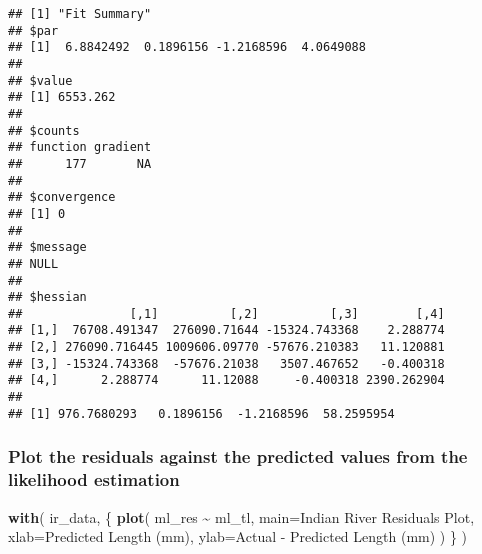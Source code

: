 \documentclass[
]{article}
\newenvironment{Shaded}{\begin{snugshade}}{\end{snugshade}}
\newcommand{\DataTypeTok}[1]{\textcolor[rgb]{0.13,0.29,0.53}{#1}}
\newcommand{\DecValTok}[1]{\textcolor[rgb]{0.00,0.00,0.81}{#1}}
\newcommand{\KeywordTok}[1]{\textcolor[rgb]{0.13,0.29,0.53}{\textbf{#1}}}
\newcommand{\NormalTok}[1]{#1}
\newcommand{\OperatorTok}[1]{\textcolor[rgb]{0.81,0.36,0.00}{\textbf{#1}}}
\newcommand{\StringTok}[1]{\textcolor[rgb]{0.31,0.60,0.02}{#1}}
\begin{document}
\begin{verbatim}
## [1] "Fit Summary"
## $par
## [1]  6.8842492  0.1896156 -1.2168596  4.0649088
## 
## $value
## [1] 6553.262
## 
## $counts
## function gradient 
##      177       NA 
## 
## $convergence
## [1] 0
## 
## $message
## NULL
## 
## $hessian
##               [,1]          [,2]          [,3]        [,4]
## [1,]  76708.491347  276090.71644 -15324.743368    2.288774
## [2,] 276090.716445 1009606.09770 -57676.210383   11.120881
## [3,] -15324.743368  -57676.21038   3507.467652   -0.400318
## [4,]      2.288774      11.12088     -0.400318 2390.262904
## 
## [1] 976.7680293   0.1896156  -1.2168596  58.2595954
\end{verbatim}

\begin{Shaded}
\end{Shaded}

\hypertarget{plot-the-residuals-against-the-predicted-values-from-the-likelihood-estimation-1}{%
\subsubsection{Plot the residuals against the predicted values from the
likelihood
estimation}\label{plot-the-residuals-against-the-predicted-values-from-the-likelihood-estimation-1}}

\begin{Shaded}
\begin{Highlighting}[]
\KeywordTok{with}\NormalTok{(}
\NormalTok{  ir\_data, \{}
    \KeywordTok{plot}\NormalTok{(}
\NormalTok{      ml\_res }\OperatorTok{\textasciitilde{}}\StringTok{ }\NormalTok{ml\_tl,}
      \DataTypeTok{main=}\StringTok{\textquotesingle{}Indian River Residuals Plot\textquotesingle{}}\NormalTok{,}
      \DataTypeTok{xlab=}\StringTok{\textquotesingle{}Predicted Length (mm)\textquotesingle{}}\NormalTok{,}
      \DataTypeTok{ylab=}\StringTok{\textquotesingle{}Actual {-} Predicted Length (mm)\textquotesingle{}}
\NormalTok{    )}
\NormalTok{  \}}
\NormalTok{)}
\end{Highlighting}
\end{Shaded}
\end{document}
